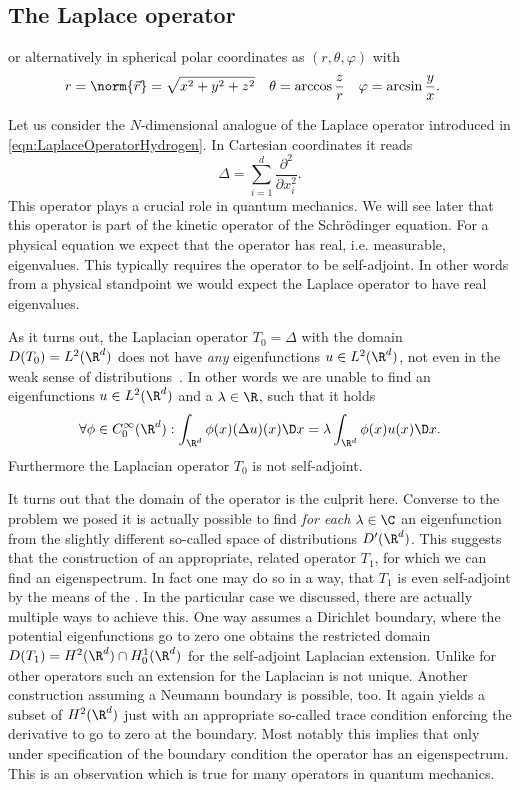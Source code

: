 \subsection{The Laplace operator}


or alternatively in spherical polar coordinates
as $(r, \theta, \varphi)$ with
\begin{align*}
	r &= \norm{\vec{r}} = \sqrt{x^2+y^2+z^2} & \theta &= \arccos\frac{z}{r} & \varphi &= \arcsin\frac{y}{x}.
\end{align*}




\label{sec:SpectrumLaplace}
Let us consider the $N$-dimensional analogue of the Laplace operator
introduced in \eqref{eqn:LaplaceOperatorHydrogen}.
In Cartesian coordinates it reads
\[ \Delta = \sum_{i=1}^d \frac{\partial^2}{\partial x_i^2}. \]
This operator plays a crucial role in quantum mechanics.
We will see later that this operator is part of the
kinetic operator of the Schrödinger equation.
For a physical equation we expect that the operator has
real, i.e. measurable, eigenvalues.
This typically requires the operator to be self-adjoint.
In other words from a physical standpoint we would expect
the Laplace operator to have real eigenvalues.

As it turns out,
the Laplacian operator $T_0 = \Delta$ with the domain $D(T_0) = L^2(\R^d)$
does not have \emph{any}
eigenfunctions $u \in L^2(\R^d)$,
not even in the weak sense of distributions~\cite{Helffer2013}.
In other words we are unable to find an eigenfunctions $u \in L^2(\R^d)$
and a $\lambda \in \R$,
such that it holds
\[ \forall \phi \in C^\infty_0(\R^d):  \int_{\R^d}\phi(x) (\Delta u)(x) \D x = \lambda \int_{\R^d} \phi(x) u(x) \D x. \]
Furthermore the Laplacian operator $T_0$ is not self-adjoint.

It turns out that the domain of the operator is the culprit here.
Converse to the problem we posed it is actually possible
to find \emph{for each} $\lambda \in \C$ an eigenfunction from the
slightly different so-called space of distributions $D'(\R^d)$.
This suggests that the construction of an appropriate, related
operator $T_1$, for which we can find an eigenspectrum.
In fact one may do so in a way, that $T_1$ is even self-adjoint
by the means of the .
In the particular case we discussed, there are actually
multiple ways to achieve this.
One way assumes a Dirichlet boundary, where the potential
eigenfunctions go to zero
one obtains the restricted domain
$D(T_1) = H^2(\R^d) \cap H^1_0(\R^d)$
for the self-adjoint Laplacian extension.
Unlike for other operators such an extension for the Laplacian
is not unique.
Another construction assuming a Neumann boundary is possible, too.
It again yields a subset of $H^2(\R^d)$ just with an appropriate
so-called trace condition enforcing the derivative to go to zero
at the boundary.
Most notably this implies that only under specification
of the boundary condition the operator has an eigenspectrum.
This is an observation which is true for many operators in quantum mechanics.

